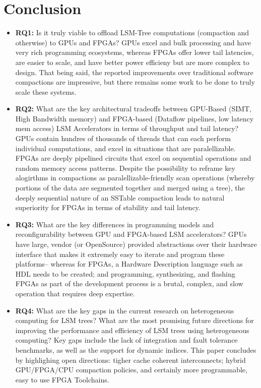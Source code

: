 \documentclass[sigconf]{acmart}
\begin{document}
    

\section{Conclusion}
  \begin{itemize}
      \item \textbf{RQ1:} Is it truly viable to offload LSM-Tree computations (compaction and otherwise) to GPUs and FPGAs?
        GPUs excel and bulk processing and have very rich programming ecosystems, whereas FPGAs offer lower tail latencies, are easier to scale, and have better power efficieny but are more complex to design. 
        That being said, the reported improvements over traditional software compactions are impressive, but there remains some work to be done to truly scale these systems.  
      \item \textbf{RQ2: } What are the key architectural tradeoffs between GPU-Based (SIMT, High Bandwidth memory) and FPGA-based (Dataflow pipelines, low latency mem access) LSM Accelerators in terms of throughput and tail latency?
        GPUs contain hundres of thousands of threads that can each perform individual computations, and excel in situations that are paralellizable. 
        FPGAs are deeply pipelined circuits that excel on sequential operations and random memory access patterns. 
        Despite the possibility to reframe key alogirthms in compactions as paralellizable-friendly scan operations (whereby portions of the data are segmented together and merged using a tree), the deeply sequential nature of an SSTable compaction leads to natural superiority for FPGAs in terms of stability and tail latency.
      \item \textbf{RQ3:} What are the key differences in programming models and reconfigurability between GPU and FPGA-based LSM accelerators?
       GPUs have large, vendor (or OpenSource) provided abstractions over their hardware interface that makes it extremely easy to iterate and program these platforms-- whereas for FPGAs, a Hardware Description language such as HDL needs to be created; and programming, synthesizing, and flashing FPGAs as part of the development process is a brutal, complex, and slow operation that requires deep expertise. 
      \item \textbf{RQ4:} What are the key gaps in the current research on heterogeneous computing for LSM trees? What are the most promising future directions for improving the performance and efficiency of LSM trees using heterogeneous computing?
      Key gaps include the lack of integration and fault tolerance benchmarks, as well as the support for dynamic indices. This paper concludes by highlighing open directions: tigher cache coherent interconnects; hybrid GPU/FPGA/CPU compaction policies, and certainly more programmable, easy to use FPGA Toolchains.
  \end{itemize}


\nocite{*}

\end{document}
